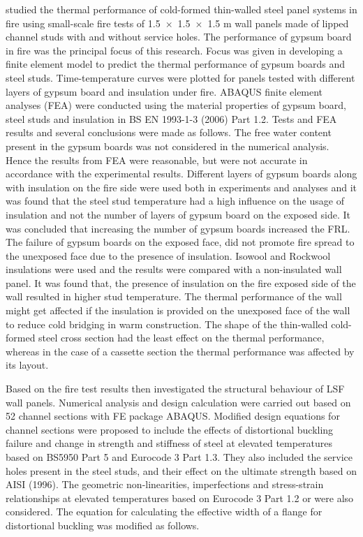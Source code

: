 \citet{Feng2003c} studied the thermal performance of cold-formed thin-walled steel panel systems in fire using small-scale fire tests of 1.5~$\times$~1.5~$\times$~1.5 m wall panels made of lipped channel studs with and without service holes. The performance of gypsum board in fire was the principal focus of this research. Focus was given in developing a finite element model to predict the thermal performance of gypsum boards and steel studs. Time-temperature curves were plotted for panels tested with different layers of gypsum board and insulation under fire. ABAQUS finite element analyses (FEA) were conducted using the material properties of gypsum board, steel studs and insulation in BS EN 1993-1-3 (2006) Part 1.2. Tests and FEA results and several conclusions were made as follows. The free water content present in the gypsum boards was not considered in the numerical analysis. Hence the results from FEA were reasonable, but were not accurate in accordance with the experimental results. Different layers of gypsum boards along with insulation on the fire side were used both in experiments and analyses and it was found that the steel stud temperature had a high influence on the usage of insulation and not the number of layers of gypsum board on the exposed side. It was concluded that increasing the number of gypsum boards increased the FRL. The failure of gypsum boards on the exposed face, did not promote fire spread to the unexposed face due to the presence of insulation. Isowool and Rockwool insulations were used and the results were compared with a non-insulated wall panel. It was found that, the presence of insulation on the fire exposed side of the wall resulted in higher stud temperature. The thermal performance of the wall might get affected if the insulation is provided on the unexposed face of the wall to reduce cold bridging in warm construction. The shape of the thin-walled cold-formed steel cross section had the least effect on the thermal performance, whereas in the case of a cassette section the thermal performance was affected by its layout.  

Based on the fire test results \citet{Feng2003d} then investigated the structural behaviour of LSF wall panels. Numerical analysis and design calculation were carried out based on 52 channel sections with FE package ABAQUS. Modified design equations for channel sections were proposed to include the effects of distortional buckling failure and change in strength and stiffness of steel at elevated temperatures based on BS5950 Part 5 and Eurocode 3 Part 1.3. They also included the service holes present in the steel studs, and their effect on the ultimate strength based on AISI (1996). The geometric non-linearities, imperfections and stress-strain relationships at elevated temperatures based on Eurocode 3 Part 1.2 or \citet{Outinen1997} were also considered. The equation for calculating the effective width of a flange for distortional buckling was modified as follows.

